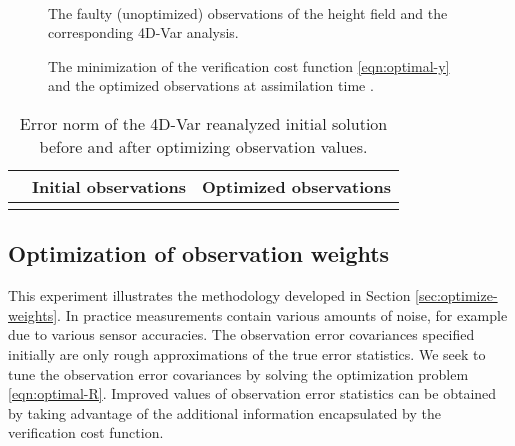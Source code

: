 \documentclass{article}
\begin{document}
\begin{figure}
\setcounter{subfigure}{0} 
\centering
  \\
\caption{The faulty (unoptimized) observations of the height field  and the corresponding 4D-Var analysis.}
\end{figure}

\begin{figure}
\setcounter{subfigure}{0}
\centering
 \caption{The minimization of the verification cost function \eqref{eqn:optimal-y} and the optimized observations at assimilation time .}
\label{fig:optobs_OBSVAL}
\end{figure}



\begin{table}
\caption{Error norm of the 4D-Var reanalyzed initial solution before and after optimizing observation values.}
\centering
{
\begin{tabular}{|c||c|c|}
  \hline
 &  Initial observations & Optimized observations \\
 \hline\hline
 &   & \\
 \hline
\end{tabular}
}
\label{Table:obsopt_gain1}
\end{table}

\subsection{Optimization of observation weights}


This experiment illustrates the methodology developed in Section \ref{sec:optimize-weights}.
In practice measurements contain various amounts of noise,
for example due to various sensor accuracies.
The observation error covariances specified initially are only rough approximations of
the true error statistics. We seek to tune the observation error covariances by solving the optimization 
problem \eqref{eqn:optimal-R}. Improved values of observation error statistics can be obtained 
by taking advantage of the additional information encapsulated by the verification cost function.
 
\end{document}
